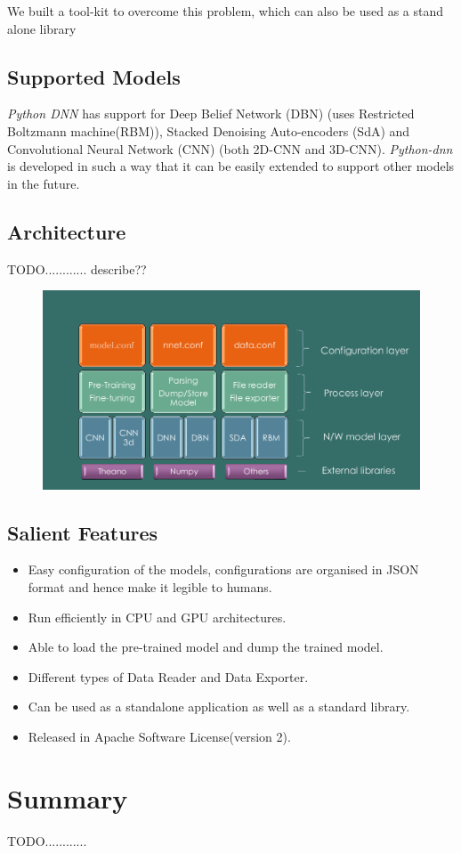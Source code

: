 We built a tool-kit to overcome this problem, which can also be used as a stand alone library


\subsection{Supported Models}
\label{sec:python-dnnModels}
\textit{Python DNN}  has support  for Deep Belief Network (DBN) \cite{hinton2002training} (uses Restricted Boltzmann machine(RBM)), Stacked Denoising Auto-encoders (SdA) \cite{vincent2010stacked} and Convolutional Neural Network (CNN) \cite{lecun1998gradient} (both 2D-CNN and 3D-CNN). \textit{Python-dnn} is developed in such a way that it can be easily extended to support other models in the future.

\subsection{Architecture}
TODO............ describe??

\begin{figure}[ht]
\includegraphics[width=1\textwidth]{./imgs/Python-DNNArch.png}
\end{figure}

\subsection{Salient Features}
\label{sec:python-dnnFeatures}
\begin{itemize}
\item Easy configuration of the models, configurations
are organised in JSON format and  hence make it legible to humans.
\item Run efficiently in CPU and GPU architectures.
\item Able to load the pre-trained model and dump the trained model.
\item Different types of Data Reader and Data Exporter.
\item Can be used as a standalone application as well as a standard  library.
\item Released in Apache Software License(version 2).\\
\end{itemize}

\section{Summary}
TODO............
